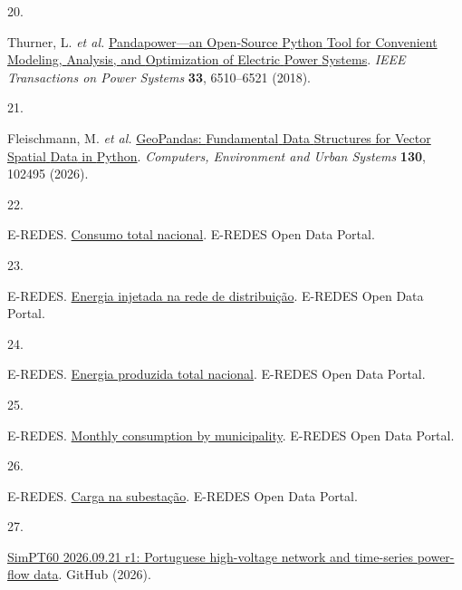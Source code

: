 \documentclass[
  10pt]{article}
\newlength{\cslhangindent}
\newlength{\csllabelwidth}
\newenvironment{CSLReferences}[2] %
 {\begin{list}{}{%
  \setlength{\itemindent}{0pt}
  \setlength{\leftmargin}{0pt}
  \setlength{\parsep}{0pt}
  \ifodd #1
   \setlength{\leftmargin}{\cslhangindent}
   \setlength{\itemindent}{-1\cslhangindent}
  \fi
  \setlength{\itemsep}{#2\baselineskip}}}
 {\end{list}}
\newcommand{\CSLLeftMargin}[1]{\parbox[t]{\csllabelwidth}{\strut#1\strut}}
\newcommand{\CSLRightInline}[1]{\parbox[t]{\linewidth - \csllabelwidth}{\strut#1\strut}}
\begin{document}
\begin{CSLReferences}{0}{0}
\CSLLeftMargin{20. }%
\CSLRightInline{Thurner, L. \emph{et al.}
\href{https://doi.org/10.1109/TPWRS.2018.2829021}{Pandapower---an
{Open-Source} {Python} {Tool} for {Convenient} {Modeling,} {Analysis,}
and {Optimization} of {Electric} {Power} {Systems}}. \emph{IEEE
Transactions on Power Systems} \textbf{33}, 6510--6521 (2018).}

\CSLLeftMargin{21. }%
\CSLRightInline{Fleischmann, M. \emph{et al.}
\href{https://doi.org/10.1016/j.compenvurbsys.2026.102495}{GeoPandas:
{Fundamental} {Data} {Structures} for {Vector} {Spatial} {Data} in
{Python}}. \emph{Computers, Environment and Urban Systems} \textbf{130},
102495 (2026).}

\CSLLeftMargin{22. }%
\CSLRightInline{E-REDES.
\href{https://e-redes.opendatasoft.com/explore/dataset/consumo-total-nacional/}{Consumo
total nacional}. E-REDES Open Data Portal.}

\CSLLeftMargin{23. }%
\CSLRightInline{E-REDES.
\href{https://e-redes.opendatasoft.com/explore/dataset/energia-injetada-na-rede-de-distribuicao/}{Energia
injetada na rede de distribuição}. E-REDES Open Data Portal.}

\CSLLeftMargin{24. }%
\CSLRightInline{E-REDES.
\href{https://e-redes.opendatasoft.com/explore/dataset/energia-produzida-total-nacional/}{Energia
produzida total nacional}. E-REDES Open Data Portal.}

\CSLLeftMargin{25. }%
\CSLRightInline{E-REDES.
\href{https://e-redes.opendatasoft.com/explore/dataset/3-consumos-faturados-por-municipio-ultimos-10-anos/}{Monthly
consumption by municipality}. E-REDES Open Data Portal.}

\CSLLeftMargin{26. }%
\CSLRightInline{E-REDES.
\href{https://e-redes.opendatasoft.com/explore/dataset/carga-na-subestacao/}{Carga
na subestação}. E-REDES Open Data Portal.}

\CSLLeftMargin{27. }%
\CSLRightInline{\href{https://github.com/MingLeiZhou/PortugueseOPD/releases/tag/SimPT60-2026.09.21-r1}{SimPT60
2026.09.21 r1: Portuguese high-voltage network and time-series
power-flow data}. GitHub (2026).}

\end{CSLReferences}
\end{document}
